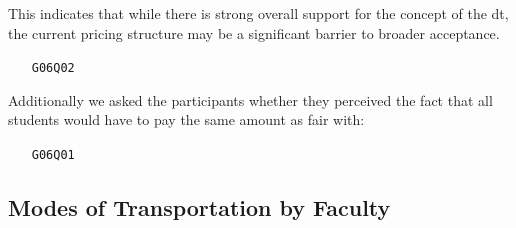 This indicates that while there is strong overall support for the concept of the \gls{dt}, the current pricing structure may be a significant barrier to broader acceptance.

\begin{multicols}{2}
    {
        
    } \columnbreak {
        
    }
\end{multicols}

\clearpage

\begin{enumerate}
    \item[\texttt{G06Q02}] 
\end{enumerate}

\begin{multicols}{2}
    
    \columnbreak
    
\end{multicols}

Additionally we asked the participants whether they perceived the fact that all students would have to pay the same amount as fair with:

\begin{enumerate}
    \item[\texttt{G06Q01}] 
\end{enumerate}

\begin{multicols}{2}
    
    \columnbreak
    
\end{multicols}

\pagebreak
\subsection{Modes of Transportation by Faculty}

